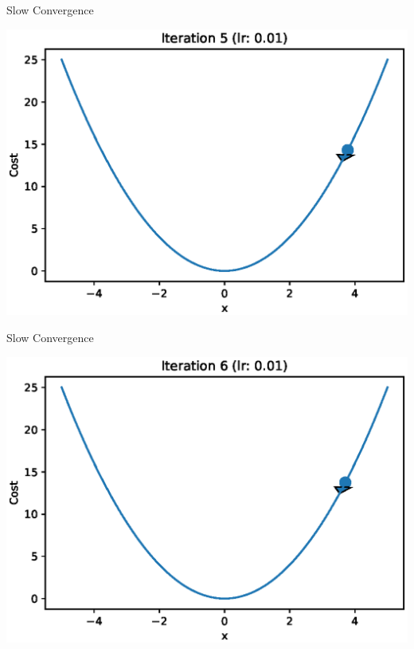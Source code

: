 \documentclass{beamer}
\begin{document}
	\begin{frame}{Slow Convergence}
		\begin{center}
			\includegraphics[totalheight=6cm]{gradient-descent/undershooting-5.eps}
		\end{center}
	\end{frame}
	
	\begin{frame}{Slow Convergence}
		\begin{center}
			\includegraphics[totalheight=6cm]{gradient-descent/undershooting-6.eps}
		\end{center}
	\end{frame}
	
\end{document}
